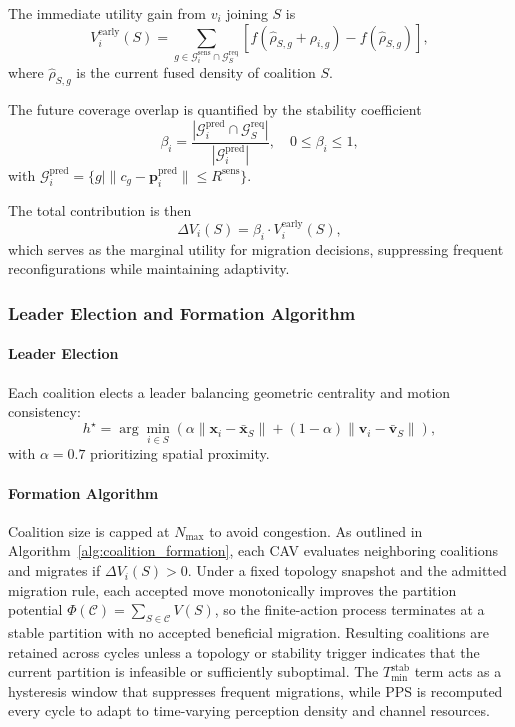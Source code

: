 \documentclass[conference]{IEEEtran}
\begin{document}
The immediate utility gain from $v_i$ joining $S$ is
\begin{equation}
V_i^{\mathrm{early}}(S) = \sum_{g \in \mathcal{G}_i^{\mathrm{sens}} \cap \mathcal{G}_S^{\mathrm{req}}} \left[ f(\hat{\rho}_{S,g} + \rho_{i,g}) - f(\hat{\rho}_{S,g}) \right],
\end{equation}
where $\hat{\rho}_{S,g}$ is the current fused density of coalition $S$.

The future coverage overlap is quantified by the stability coefficient
\begin{equation}
\beta_i = \frac{|\mathcal{G}_i^{\mathrm{pred}} \cap \mathcal{G}_S^{\mathrm{req}}|}{|\mathcal{G}_i^{\mathrm{pred}}|}, \quad 0 \leq \beta_i \leq 1,
\end{equation}
with $\mathcal{G}_i^{\mathrm{pred}} = \{ g \mid \|c_g - \mathbf{p}_i^{\mathrm{pred}}\| \leq R^{\mathrm{sens}} \}$.

The total contribution is then
\begin{equation}
\Delta V_i(S) = \beta_i \cdot V_i^{\mathrm{early}}(S),
\label{eq:deltaV_i}
\end{equation}
which serves as the marginal utility for migration decisions, suppressing frequent reconfigurations while maintaining adaptivity.

\subsubsection{Leader Election and Formation Algorithm}

\paragraph{Leader Election}
Each coalition elects a leader balancing geometric centrality and motion consistency:
\begin{equation}
h^\star = \arg\min_{i \in S} \left( \alpha \|\mathbf{x}_i - \bar{\mathbf{x}}_S\| + (1 - \alpha) \|\mathbf{v}_i - \bar{\mathbf{v}}_S\| \right),
\end{equation}
with $\alpha = 0.7$ prioritizing spatial proximity.

\paragraph{Formation Algorithm}
Coalition size is capped at $N_{\max}$ to avoid congestion. As outlined in Algorithm~\ref{alg:coalition_formation}, each CAV evaluates neighboring coalitions and migrates if $\Delta V_i(S) > 0$. Under a fixed topology snapshot and the admitted migration rule, each accepted move monotonically improves the partition potential $\Phi(\mathcal{C}) = \sum_{S \in \mathcal{C}} V(S)$, so the finite-action process terminates at a stable partition with no accepted beneficial migration. Resulting coalitions are retained across cycles unless a topology or stability trigger indicates that the current partition is infeasible or sufficiently suboptimal. The $T_{\min}^{\mathrm{stab}}$ term acts as a hysteresis window that suppresses frequent migrations, while PPS is recomputed every cycle to adapt to time-varying perception density and channel resources.
\end{document}
